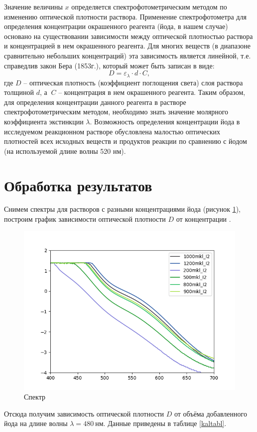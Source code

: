 \documentclass[a4paper, 12pt]{article}
\begin{document}
Значение величины $x$ определяется спектрофотометрическим методом по изменению оптической плотности раствора. Применение спектрофотометра для определения концентрации окрашенного реагента (йода, в нашем случае) основано на существовании зависимости между оптической плотностью раствора и концентрацией в нем окрашенного реагента. Для многих веществ (в диапазоне сравнительно небольших концентраций) эта зависимость является линейной, т.е. справедлив закон Бера (1853г.), который может быть записан в виде:
\begin{equation}\label{Ber}
D = \varepsilon_\lambda\cdot d\cdot C,
\end{equation}
где $D$ – оптическая плотность (коэффициент поглощения света) слоя раствора толщиной $d$, а $\ C$ – концентрация в нем окрашенного реагента. Таким образом, для определения концентрации данного реагента в растворе спектрофотометрическим методом, необходимо знать значение молярного коэффициента экстинкции $\lambda$. Возможность определения концентрации йода в исследуемом реакционном растворе обусловлена малостью оптических плотностей всех исходных веществ и продуктов реакции по сравнению с йодом (на используемой длине волны 520 нм).

\newpage
\section{Обработка результатов}
Снимем спектры для растворов с разными концентрациями йода (рисунок \ref{spc}), построим график зависимости оптической плотности $D$ от концентрации \ce{[J2]}.\\

\begin{figure}[h]
	\centering
	\caption{Спектр}\label{spc}
	\includegraphics[width=1\textwidth]{Spector.png}
\end{figure}
Отсюда получим зависимость оптической плотности $D$ от объёма добавленного йода на длине волны $\lambda=480\ \text{нм}$. Данные приведены в таблице \ref{kaltabl}.\\ 
\end{document}

